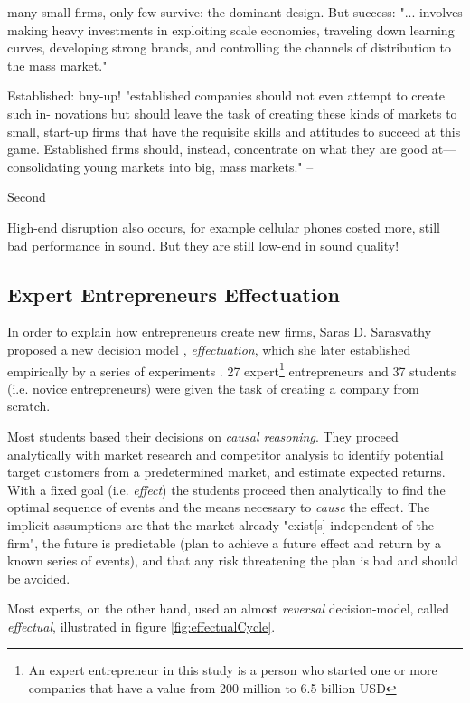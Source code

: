 \documentclass[a4paper,10pt]{book}
\begin{document}
many small firms, only few survive: the dominant design. But success:
"... involves making heavy investments in exploiting scale economies, traveling down
learning curves, developing strong brands, and controlling the channels of distribution to the mass market."

Established: buy-up!
"established
companies should not even attempt to create such in-
novations but should leave the task of creating these
kinds of markets to small, start-up firms that have the
requisite skills and attitudes to succeed at this game.
Established firms should, instead, concentrate on
what they are good at—consolidating young markets
into big, mass markets." \cite{scientificArticleDisruptiveInnovationBetterTheory}
--

Second \cite{phdChristianStrom}

High-end disruption also occurs, for example cellular phones costed more, still bad performance in sound.
But they are still low-end in sound quality!

\newpage

\subsection{Expert Entrepreneurs Effectuation}
In order to explain how entrepreneurs create new firms, Saras D. Sarasvathy proposed a new decision model \cite{effectuationProposal}, \emph{effectuation}, 
which she later established empirically by a series of experiments \cite{effectuationExperiment}.
27 expert\footnote{An expert entrepreneur in this study is a person who started one or more companies that have a value from 200 million to 6.5 billion USD}
entrepreneurs and 37 students (i.e. novice entrepreneurs) were given the task of creating a company from scratch.

Most students based their decisions on \emph{causal reasoning}. They proceed analytically with market research and competitor analysis 
to identify potential target customers from a predetermined market, and estimate expected returns. With a fixed goal (i.e. \emph{effect}) the students proceed then 
analytically to find the optimal sequence of events and the means necessary to \emph{cause} the effect. 
The implicit assumptions are that the market already "exist[s] independent of the firm", the future is predictable 
(plan to achieve a future effect and return by a known series of events), and that any risk threatening the plan is bad and should be avoided.

Most experts, on the other hand, used an almost \emph{reversal} decision-model, called \emph{effectual}, illustrated in figure \ref{fig:effectualCycle}. \\
\end{document}
